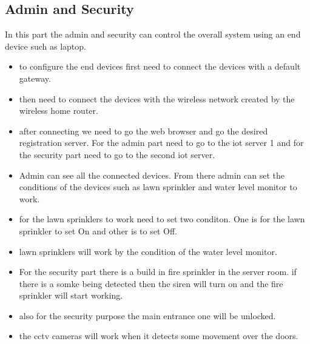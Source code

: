 \documentclass{report}
\begin{document}
\subsection{Admin and Security}
In this part the admin and security can control the overall system using an end device such as laptop.\\
\begin{itemize}
    \item to configure the end devices first need to connect the devices with a default gateway.
    \item then need to connect the devices with the wireless network created by the wireless home router.
    \item after connecting we need to go the web browser and go the desired registration server. For the admin part need to go to the iot server 1 and for the security part need to go to the second iot server.
    \item Admin can see all the connected devices. From there admin can set the conditions of the devices such as lawn sprinkler and water level monitor to work.
    \item for the lawn sprinklers to work need to set two conditon. One is for the lawn sprinkler to set On and other is to set Off. 
    \item lawn sprinklers will work by the condition of the water level monitor.
    \item For the security part there is a build in fire sprinkler in the server room. if there is a somke being detected then the siren will turn on and the fire sprinkler will start working.
    \item also for the security purpose the main entrance one will be unlocked. 
    \item the cctv cameras will work when it detects some movement over the doors.
\end{itemize}
\end{document}

